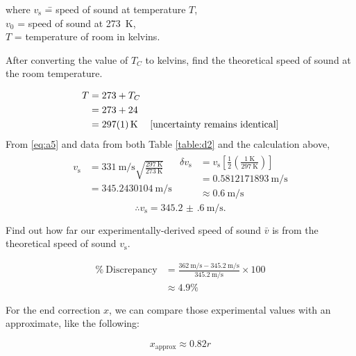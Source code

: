 \documentclass[letter]{article}
\numberwithin{equation}{section}
\numberwithin{figure}{section}
\numberwithin{table}{section}
\begin{document}
\begin{tabbing}
  where \= \(v_{\mathrm{s}}\) \= = speed of sound at temperature \(T\), \\
  \> \(v_0\) \> = speed of sound at \SI{273}{\kelvin}, \\
  \> \(T\) \> = temperature of room in kelvins.
\end{tabbing}

After converting the value of \(T_C\) to kelvins, find the theoretical speed of sound at the room temperature.

\begin{align} \label{eq:a6}
  T &= 273 + T_C \\
  &= 273 + 24 \notag \\
  &= \SI{297(1)}{\kelvin} & \text{[uncertainty remains identical]} \notag
\end{align}
From \eqref{eq:a5} and data from both Table \ref{table:d2} and the calculation above,
\begin{align*}
  \begin{split}
    v_{\mathrm{s}} &= \SI{331}{\metre\per\second} \sqrt{\frac{\SI{297}{\kelvin}}{\SI{273}{\kelvin}}} \\
    &= \SI{345.2430104}{\metre\per\second}
  \end{split}
  \begin{split}
    \delta v_{\mathrm{s}} &= v_{\mathrm{s}} \left[\frac{1}{2} \left( \frac{\SI{1}{\kelvin}}{\SI{297}{\kelvin}} \right)  \right] \\
    &= \SI{0.5812171893}{\metre\per\second} \\
    &\approx \SI{0.6}{\metre\per\second}
  \end{split}
\end{align*}
\[\therefore v_{\mathrm{s}} = \SI{345.2(6)}{\metre\per\second}.\]

Find out how far our experimentally-derived speed of sound \(\bar{v}\) is from the theoretical speed of sound \(v_{\mathrm{s}}\).

\begin{align*}
  \mathrm{\%\ Discrepancy} &= \frac{\SI{362}{\metre\per\second} - \SI{345.2}{\metre\per\second}}{\SI{345.2}{\metre\per\second}} \times 100 \\
  &\approx 4.9\%
\end{align*}

For the end correction \(x\), we can compare those experimental values with an approximate, like the following:

\begin{equation} \label{eq:a7}
  x_{\mathrm{approx}} \approx 0.82r
\end{equation}
\end{document}
